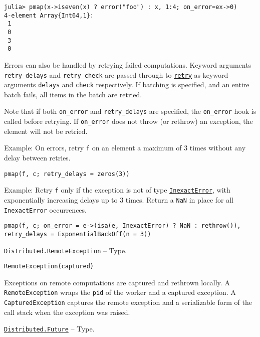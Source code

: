 \begin{adjustwidth}{2em}{0pt}
\begin{verbatim}
julia> pmap(x->iseven(x) ? error("foo") : x, 1:4; on_error=ex->0)
4-element Array{Int64,1}:
 1
 0
 3
 0
\end{verbatim}

Errors can also be handled by retrying failed computations. Keyword arguments \texttt{retry\_delays} and \texttt{retry\_check} are passed through to \hyperlink{13615447016541985376}{\texttt{retry}} as keyword arguments \texttt{delays} and \texttt{check} respectively. If batching is specified, and an entire batch fails, all items in the batch are retried.

Note that if both \texttt{on\_error} and \texttt{retry\_delays} are specified, the \texttt{on\_error} hook is called before retrying. If \texttt{on\_error} does not throw (or rethrow) an exception, the element will not be retried.

Example: On errors, retry \texttt{f} on an element a maximum of 3 times without any delay between retries.


\begin{verbatim}
pmap(f, c; retry_delays = zeros(3))
\end{verbatim}

Example: Retry \texttt{f} only if the exception is not of type \hyperlink{5399118524830636312}{\texttt{InexactError}}, with exponentially increasing delays up to 3 times. Return a \texttt{NaN} in place for all \texttt{InexactError} occurrences.


\begin{verbatim}
pmap(f, c; on_error = e->(isa(e, InexactError) ? NaN : rethrow()), retry_delays = ExponentialBackOff(n = 3))
\end{verbatim}



\end{adjustwidth}
\hypertarget{10250718604436154991}{}
\hyperlink{10250718604436154991}{\texttt{Distributed.RemoteException}}  -- {Type.}

\begin{adjustwidth}{2em}{0pt}


\begin{verbatim}
RemoteException(captured)
\end{verbatim}

Exceptions on remote computations are captured and rethrown locally.  A \texttt{RemoteException} wraps the \texttt{pid} of the worker and a captured exception. A \texttt{CapturedException} captures the remote exception and a serializable form of the call stack when the exception was raised.



\end{adjustwidth}
\hypertarget{4170271048165085864}{}
\hyperlink{4170271048165085864}{\texttt{Distributed.Future}}  -- {Type.}

